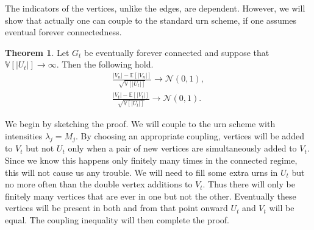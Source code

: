 \documentclass[12pt]{article}
\theoremstyle{definition}
\newtheorem{theorem}[proposition]{Theorem}
\begin{document}
The indicators of the vertices, unlike the edges, are dependent. However, we will show that actually one can couple to the standard urn scheme, if one assumes eventual forever connectedness.

\begin{theorem} \label{connected Gauss}
    Let $G_t$ be eventually forever connected and suppose that $\mathbb{V}[|U_t|] \rightarrow \infty$. Then the following hold. \begin{align*}
    \frac{|V_n|-\mathbb{E}[|V_n|]}{\sqrt{\mathbb{V}[|U_t|]}} \rightarrow \mathcal{N}(0,1), \\
        \frac{|V_t|-\mathbb{E}[|V_t|]}{\sqrt{\mathbb{V}[|U_t|]}} \rightarrow \mathcal{N}(0,1).
    \end{align*}
\end{theorem}
We begin by sketching the proof. We will couple to the urn scheme with intensities $\lambda_j = M_j$. By choosing an appropriate coupling, vertices will be added to $V_t$ but not $U_t$ only when a pair of new vertices are simultaneously added to $V_t$. Since we know this happens only finitely many times in the connected regime, this will not cause us any trouble. We will need to fill some extra urns in $U_t$ but no more often than the double vertex additions to $V_t$. Thus there will only be finitely many vertices that are ever in one but not the other. Eventually these vertices will be present in both and from that point onward $U_t$ and $V_t$ will be equal. The coupling inequality will then complete the proof.
\end{document}
